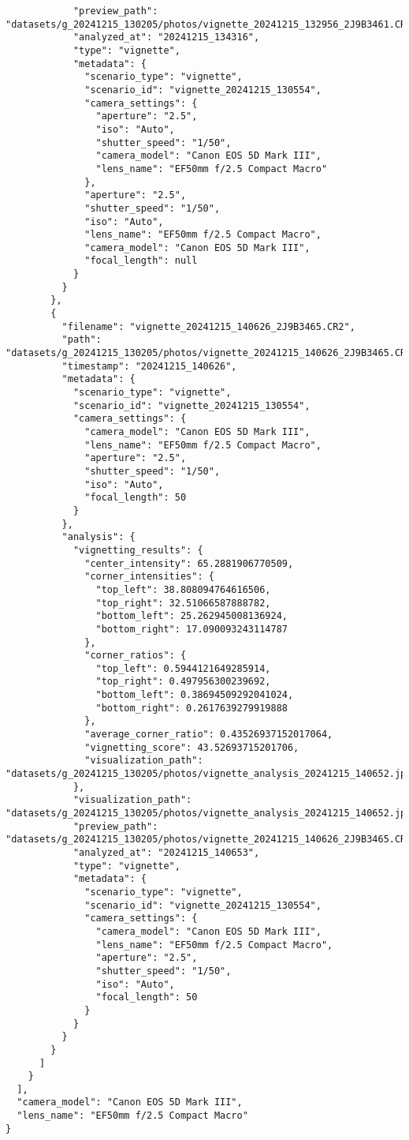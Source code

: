 \begin{verbatim}
            "preview_path": "datasets/g_20241215_130205/photos/vignette_20241215_132956_2J9B3461.CR2",
            "analyzed_at": "20241215_134316",
            "type": "vignette",
            "metadata": {
              "scenario_type": "vignette",
              "scenario_id": "vignette_20241215_130554",
              "camera_settings": {
                "aperture": "2.5",
                "iso": "Auto",
                "shutter_speed": "1/50",
                "camera_model": "Canon EOS 5D Mark III",
                "lens_name": "EF50mm f/2.5 Compact Macro"
              },
              "aperture": "2.5",
              "shutter_speed": "1/50",
              "iso": "Auto",
              "lens_name": "EF50mm f/2.5 Compact Macro",
              "camera_model": "Canon EOS 5D Mark III",
              "focal_length": null
            }
          }
        },
        {
          "filename": "vignette_20241215_140626_2J9B3465.CR2",
          "path": "datasets/g_20241215_130205/photos/vignette_20241215_140626_2J9B3465.CR2",
          "timestamp": "20241215_140626",
          "metadata": {
            "scenario_type": "vignette",
            "scenario_id": "vignette_20241215_130554",
            "camera_settings": {
              "camera_model": "Canon EOS 5D Mark III",
              "lens_name": "EF50mm f/2.5 Compact Macro",
              "aperture": "2.5",
              "shutter_speed": "1/50",
              "iso": "Auto",
              "focal_length": 50
            }
          },
          "analysis": {
            "vignetting_results": {
              "center_intensity": 65.2881906770509,
              "corner_intensities": {
                "top_left": 38.808094764616506,
                "top_right": 32.51066587888782,
                "bottom_left": 25.262945008136924,
                "bottom_right": 17.090093243114787
              },
              "corner_ratios": {
                "top_left": 0.5944121649285914,
                "top_right": 0.497956300239692,
                "bottom_left": 0.38694509292041024,
                "bottom_right": 0.2617639279919888
              },
              "average_corner_ratio": 0.43526937152017064,
              "vignetting_score": 43.52693715201706,
              "visualization_path": "datasets/g_20241215_130205/photos/vignette_analysis_20241215_140652.jpg"
            },
            "visualization_path": "datasets/g_20241215_130205/photos/vignette_analysis_20241215_140652.jpg",
            "preview_path": "datasets/g_20241215_130205/photos/vignette_20241215_140626_2J9B3465.CR2",
            "analyzed_at": "20241215_140653",
            "type": "vignette",
            "metadata": {
              "scenario_type": "vignette",
              "scenario_id": "vignette_20241215_130554",
              "camera_settings": {
                "camera_model": "Canon EOS 5D Mark III",
                "lens_name": "EF50mm f/2.5 Compact Macro",
                "aperture": "2.5",
                "shutter_speed": "1/50",
                "iso": "Auto",
                "focal_length": 50
              }
            }
          }
        }
      ]
    }
  ],
  "camera_model": "Canon EOS 5D Mark III",
  "lens_name": "EF50mm f/2.5 Compact Macro"
}
\end{verbatim}

